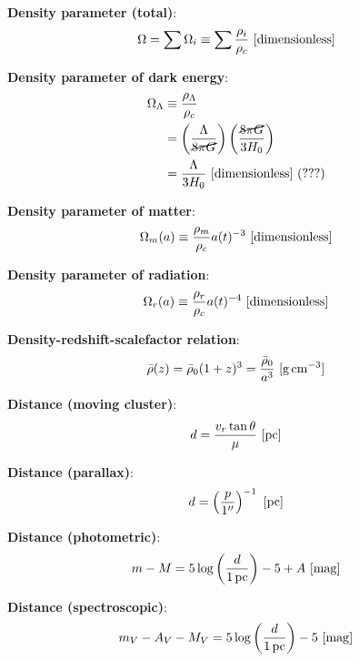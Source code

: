 \documentclass[a4paper,11pt]{article}
\begin{document}
{\noindent}\textbf{Density parameter (total)}:
\begin{align*}
    \Omega = \sum\Omega_i \equiv \sum \frac{\rho_i}{\rho_c} ~ [{\rm dimensionless}]
\end{align*}

{\noindent}\textbf{Density parameter of dark energy}:
\begin{align*}
    \Omega_\Lambda &\equiv \dfrac{\rho_\Lambda}{\rho_c} \\
    &= \left(\dfrac{\Lambda}{\cancel{8\pi G}}\right) \left(\dfrac{\cancel{8\pi G}}{3H_0}\right) \\
    &= \dfrac{\Lambda}{3H_0} ~ [{\rm dimensionless}] ~ (???)
\end{align*}

{\noindent}\textbf{Density parameter of matter}:
\begin{align*}
    \Omega_m(a) \equiv \dfrac{\rho_m}{\rho_c}a(t)^{-3} ~ [{\rm dimensionless}]
\end{align*}

{\noindent}\textbf{Density parameter of radiation}:
\begin{align*}
    \Omega_r(a) \equiv \dfrac{\rho_r}{\rho_c}a(t)^{-4} ~ [{\rm dimensionless}]
\end{align*}

{\noindent}\textbf{Density-redshift-scalefactor relation}:
\begin{align*}
    \bar{\rho}(z) = \bar{\rho}_0(1+z)^3 = \frac{\bar{\rho}_0}{a^3} ~ [{\rm g\,cm^{-3}}]
\end{align*}

{\noindent}\textbf{Distance (moving cluster)}:
\begin{align*}
    d = \frac{v_r\tan\theta}{\mu} ~ [{\rm pc}]
\end{align*}

{\noindent}\textbf{Distance (parallax)}:
\begin{align*}
    d = \left(\frac{p}{1''}\right)^{-1} ~ {[\rm pc]}
\end{align*}

{\noindent}\textbf{Distance (photometric)}:
\begin{align*}
    m-M = 5\log\left(\frac{d}{1\,{\rm pc}}\right)-5+A ~ [{\rm mag}]
\end{align*}

{\noindent}\textbf{Distance (spectroscopic)}:
\begin{align*}
    m_V-A_V-M_V = 5\log\left(\frac{d}{1\,{\rm pc}}\right)-5 ~ [{\rm mag}]
\end{align*}
\end{document}
